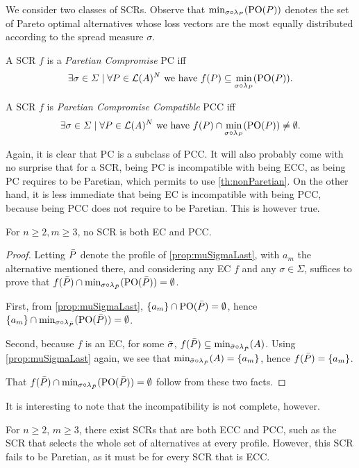 \documentclass[version=3.21, pagesize, twoside=off, bibliography=totoc, DIV=calc, fontsize=12pt, a4paper]{scrartcl}
\begin{document}
We consider two classes of SCRs. 
Observe that $\mustar$ denotes the set of Pareto optimal alternatives whose loss vectors are the most equally distributed according to the spread measure $\sigma$.

\begin{definition} A SCR $f$ is a \emph{Paretian Compromise} PC iff \[\exists \sigma \in \Sigma \suchthat \forall P \in \linors^N \text{ we have } f(P) \subseteq \mustar.\]
\end{definition}

\begin{definition} A SCR $f$ is \emph{Paretian Compromise Compatible} PCC iff \[\exists \sigma \in \Sigma \suchthat \forall P \in \linors^N \text{ we have } f(P) \cap \mustar \neq \emptyset.\]
\end{definition}

Again, it is clear that PC is a subclass of PCC. It will also probably come with no surprise that for a SCR, being PC is incompatible with being ECC, as being PC requires to be Paretian, which permits to use \cref{th:nonParetian}. On the other hand, it is less immediate that being EC is incompatible with
being PCC, because being PCC does not require to be Paretian. This is however true.

\begin{theorem} \label{th:incompatibility} 
	For $n ≥ 2, m ≥ 3$, no SCR is both EC and PCC.
\end{theorem}
\begin{proof}	
	Letting $\bar{P}$ denote the profile of \cref{prop:muSigmaLast}, with $a_m$ the alternative mentioned there, and considering any EC $f$ and any $\sigma \in \Sigma$, suffices to prove that $f(\Ptop) \cap {\mustar[\sigma][\Ptop]} = \emptyset$.
	
	First, from \cref{prop:muSigmaLast}, $\{a_m\} \cap \text{PO}(\bar{P}) = \emptyset$, hence $\set{a_m} \cap {\mustar[\sigma][\Ptop]} = \emptyset$. 
	
	Second, because $f$ is an EC, for some $\bar{\sigma}$, $f(\Ptop) \subseteq {\musigma[\sigmatop][\Ptop]}$. Using \cref{prop:muSigmaLast} again, we see that ${\musigma[\sigmatop][\Ptop]} = \set{a_m}$, hence $f(\bar{P}) = \{a_m\}$.
	
	That $f(\Ptop) \cap {\mustar[\sigma][\Ptop]} = \emptyset$ follow from these two facts.
\end{proof}

It is interesting to note that the incompatibility is not complete, however.

\begin{remark}
	For $n ≥ 2$, $m ≥ 3$, there exist SCRs that are both ECC and PCC, such as the SCR that selects the whole set of alternatives at every profile. However, this SCR fails to be Paretian, as it must be for every SCR that is ECC.
\end{remark}
\end{document}
